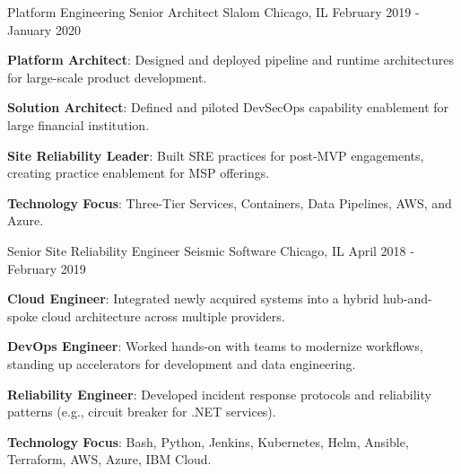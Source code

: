 \begin{cventries}
  \cventry
    {Platform Engineering Senior Architect} %
    {Slalom} %
    {Chicago, IL} %
    {February 2019 - January 2020} %
    {
      \begin{cvitems} %
        \item {\textbf{Platform Architect}: Designed and deployed pipeline and runtime architectures for large-scale product development.}
        \item {\textbf{Solution Architect}: Defined and piloted DevSecOps capability enablement for large financial institution.}
        \item {\textbf{Site Reliability Leader}: Built SRE practices for post-MVP engagements, creating practice enablement for MSP offerings.}
        \item {\textbf{Technology Focus}: Three-Tier Services, Containers, Data Pipelines, AWS, and Azure.}
      \end{cvitems}
    }

  \cventry
    {Senior Site Reliability Engineer} %
    {Seismic Software} %
    {Chicago, IL} %
    {April 2018 - February 2019} %
    {
      \begin{cvitems} %
        \item {\textbf{Cloud Engineer}: Integrated newly acquired systems into a hybrid hub-and-spoke cloud architecture across multiple providers.}
        \item {\textbf{DevOps Engineer}: Worked hands-on with teams to modernize workflows, standing up accelerators for development and data engineering.}
        \item {\textbf{Reliability Engineer}: Developed incident response protocols and reliability patterns (e.g., circuit breaker for .NET services).}
        \item {\textbf{Technology Focus}: Bash, Python, Jenkins, Kubernetes, Helm, Ansible, Terraform, AWS, Azure, IBM Cloud.}
      \end{cvitems}
    }


\end{cventries}
